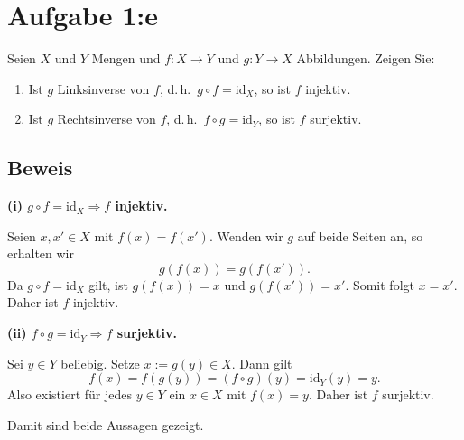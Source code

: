 \documentclass{article}
\begin{document}
\section*{Aufgabe 1:e}
Seien \(X\) und \(Y\) Mengen und \(f\colon X\to Y\) und \(g\colon Y\to X\) Abbildungen. Zeigen Sie:
\begin{enumerate}[label=(\roman*)]
    \item Ist \(g\) Linksinverse von \(f\), d.\,h.\ \(g\circ f=\mathrm{id}_X\), so ist \(f\) injektiv.
    \item Ist \(g\) Rechtsinverse von \(f\), d.\,h.\ \(f\circ g=\mathrm{id}_Y\), so ist \(f\) surjektiv.
\end{enumerate}

\subsection*{Beweis}

\textbf{(i) $g\circ f=\mathrm{id}_X \Rightarrow f$ injektiv.}

Seien \(x,x'\in X\) mit \(f(x)=f(x')\). Wenden wir \(g\) auf beide Seiten an, so erhalten wir
\[
    g(f(x))=g(f(x')).
\]
Da \(g\circ f=\mathrm{id}_X\) gilt, ist \(g(f(x))=x\) und \(g(f(x'))=x'\). Somit folgt \(x=x'\). Daher ist \(f\) injektiv.

\bigskip

\textbf{(ii) $f\circ g=\mathrm{id}_Y \Rightarrow f$ surjektiv.}

Sei \(y\in Y\) beliebig. Setze \(x:=g(y)\in X\). Dann gilt
\[
    f(x)=f(g(y))=(f\circ g)(y)=\mathrm{id}_Y(y)=y.
\]
Also existiert für jedes \(y\in Y\) ein \(x\in X\) mit \(f(x)=y\). Daher ist \(f\) surjektiv.

\bigskip

\noindent Damit sind beide Aussagen gezeigt.
\end{document}
